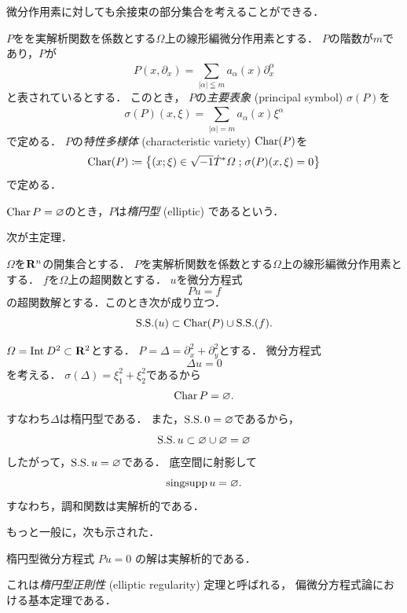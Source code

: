 微分作用素に対しても余接束の部分集合を考えることができる．

\begin{DFN}
  \(P\)をを実解析関数を係数とする\(\varOmega\)上の線形編微分作用素とする．
  \(P\)の階数が\(m\)であり，\(P\)が
  \[
    P(x,\partial_x)
    =
    \sum_{\left|\alpha\right|\leqq m}^{}
    a_{\alpha}(x)\partial_{x}^{\alpha}
  \]
  と表されているとする．
  このとき，
  \(P\)の\emph{主要表象} (principal symbol) \(\sigma(P)\)を
  \[
    \sigma(P)(x,\xi)
    =\sum_{\left|\alpha\right|= m}^{}
    a_{\alpha}(x)\xi^{\alpha}
  \]で定める．
  \(P\)の\emph{特性多様体} (characteristic variety) 
  \(\Char(P)\)を
  \[
    \Char(P)
    \coloneqq
    \left\{(x;\xi)\in \sqrt{-1}\cotn[\varOmega]\smid
      \sigma(P)(x,\xi)=0
    \right\}
  \]
  で定める．

  \(\Char{P}=\varnothing\)のとき，\(P\)は\emph{楕円型} (elliptic) であるという．
\end{DFN}

次が主定理．

\begin{THM}
  \(\varOmega\)を\(\rr^n\)の開集合とする．
  \(P\)を実解析関数を係数とする\(\varOmega\)上の線形編微分作用素とする．
  \(f\)を\(\varOmega\)上の超関数とする．
  \(u\)を微分方程式
  \[
    Pu=f
  \]
  の超関数解とする．このとき次が成り立つ．
  \[
    \SingSpec(u)\subset\Char(P)\cup\SingSpec(f).
  \]
\end{THM}

\begin{EG}
  \(\varOmega=\Int[]D^2\subset\rr^2\)とする．
  \(P=\Delta=\partial_{x}^{2}+\partial_{y}^{2}\)とする．
  微分方程式
  \[
    \Delta u=0
  \]
  を考える．
  \(\sigma(\Delta)=\xi_{1}^2+\xi_{2}^2\)であるから
  \begin{align*}
    \Char{P}= \varnothing.
  \end{align*}
  すなわち\(\Delta\)は楕円型である．
  また，\(\SingSpec0=\varnothing\)であるから，
  \[
    \SingSpec u\subset \varnothing\cup \varnothing =\varnothing
  \]
  したがって，\(\SingSpec {u}=\varnothing\)である．
  底空間に射影して
  \[
    \SingSupp{u}=\varnothing.
  \]
  すなわち，調和関数は実解析的である．
\end{EG}

もっと一般に，次も示された．
\begin{THM}
  楕円型微分方程式
  \(Pu=0\)
  の解は実解析的である．
\end{THM}
これは\emph{楕円型正則性} (elliptic regularity) 定理と呼ばれる，
偏微分方程式論における基本定理である．

